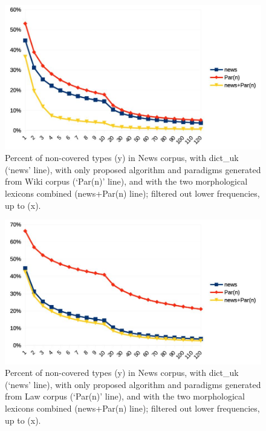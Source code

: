 \documentclass[11pt,a4paper]{article}
\begin{document}
\begin{figure}
	\includegraphics[width=\linewidth]{evaluation-coverage-newsW.jpg}
	\caption{Percent of non-covered types (y) in News corpus, with dict\_uk (`news' line), with only proposed algorithm and paradigms generated from Wiki corpus (`Par(n)' line), and with the two morphological lexicons combined (news+Par(n) line); filtered out lower frequencies, up to (x).}
	\label{fig:pcNoTypNewsW}
\end{figure}

\begin{figure}
	\includegraphics[width=\linewidth]{evaluation-coverage-newsL.jpg}
	\caption{Percent of non-covered types (y) in News corpus, with dict\_uk (`news' line), with only proposed algorithm and paradigms generated from Law corpus (`Par(n)' line), and with the two morphological lexicons combined (news+Par(n) line); filtered out lower frequencies, up to (x).}
	\label{fig:pcNoTypNewsL}
\end{figure}
\end{document}
